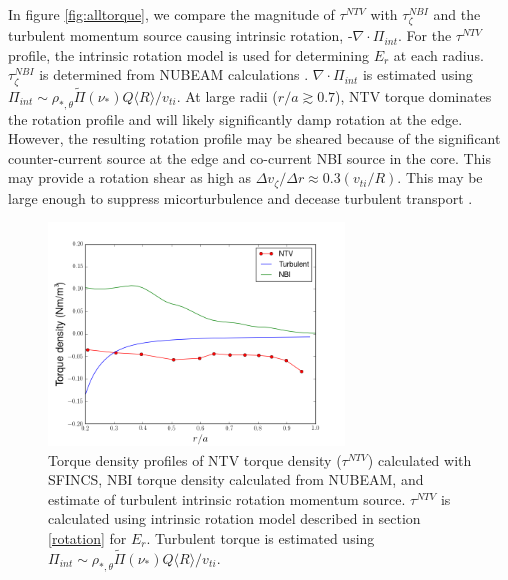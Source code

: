 \documentclass{article}
\begin{document}
In figure \ref{fig:alltorque}, we compare the magnitude of $\tau^{NTV}$ with $\tau_{\zeta}^{NBI}$ and the turbulent momentum source causing intrinsic rotation, -$\nabla \cdot \Pi_{int}$. For the $\tau^{NTV}$ profile, the intrinsic rotation model is used for determining $E_r$ at each radius. $\tau_{\zeta}^{NBI}$ is determined from NUBEAM calculations \cite{Poli2014}. $\nabla \cdot \Pi_{int}$ is estimated using $\Pi_{int} \sim \rho_{*, \theta} \widetilde{\Pi}(\nu_*) Q \langle R \rangle/v_{ti}$. At large radii ($r/a \gtrsim 0.7$), NTV torque dominates the rotation profile and will likely significantly damp rotation at the edge. However, the resulting rotation profile may be sheared because of the significant counter-current source at the edge and co-current NBI source in the core. This may provide a rotation shear as high as $\Delta v_{\zeta}/ \Delta r \approx 0.3 (v_{ti}/R)$. This may be large enough to suppress micorturbulence and decease turbulent transport \cite{Hahm1994}. 

\begin{figure}[h!]
\centering
\includegraphics[width=0.7\textwidth]{AllTorquePlot.png}
\caption{Torque density profiles of NTV torque density ($\tau^{NTV}$) calculated with SFINCS, NBI torque density calculated from NUBEAM, and estimate of turbulent intrinsic rotation momentum source. $\tau^{NTV}$ is calculated using intrinsic rotation model described in section \ref{rotation} for $E_r$. Turbulent torque is estimated using $\Pi_{int} \sim \rho_{*, \theta} \widetilde{\Pi}(\nu_*) Q \langle R \rangle/v_{ti}$.}
\end{figure}\label{fig:alltorque}

\FloatBarrier
\end{document}
